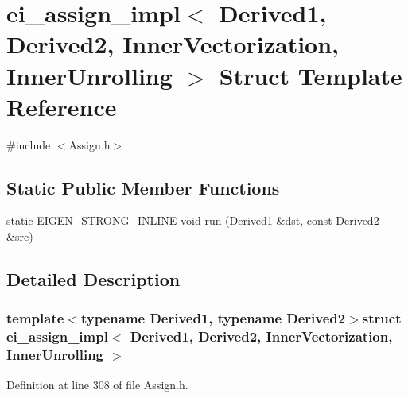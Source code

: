 \hypertarget{structei__assign__impl_3_01_derived1_00_01_derived2_00_01_inner_vectorization_00_01_inner_unrolling_01_4}{\section{ei\-\_\-assign\-\_\-impl$<$ Derived1, Derived2, Inner\-Vectorization, Inner\-Unrolling $>$ Struct Template Reference}
\label{structei__assign__impl_3_01_derived1_00_01_derived2_00_01_inner_vectorization_00_01_inner_unrolling_01_4}
}


{\ttfamily \#include $<$Assign.\-h$>$}

\subsection*{Static Public Member Functions}
\begin{DoxyCompactItemize}
\item 
static E\-I\-G\-E\-N\-\_\-\-S\-T\-R\-O\-N\-G\-\_\-\-I\-N\-L\-I\-N\-E \hyperlink{group___u_a_v_objects_plugin_ga444cf2ff3f0ecbe028adce838d373f5c}{void} \hyperlink{structei__assign__impl_3_01_derived1_00_01_derived2_00_01_inner_vectorization_00_01_inner_unrolling_01_4_ac9b88cb88bbeed9a8b956b1bc87d3f72}{run} (Derived1 \&\hyperlink{glext_8h_a92034251bfd455d524a9b5610cddba00}{dst}, const Derived2 \&\hyperlink{glext_8h_a72e0fdf0f845ded60b1fada9e9195cd7}{src})
\end{DoxyCompactItemize}


\subsection{Detailed Description}
\subsubsection*{template$<$typename Derived1, typename Derived2$>$struct ei\-\_\-assign\-\_\-impl$<$ Derived1, Derived2, Inner\-Vectorization, Inner\-Unrolling $>$}



Definition at line 308 of file Assign.\-h.



